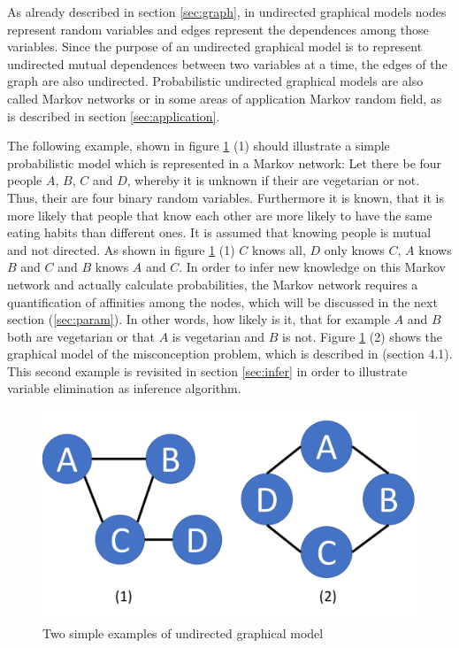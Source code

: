 \cite{hammersley1971markov}
\cite{pearl2014probabilistic}

As already described in section \ref{sec:graph}, in undirected graphical models nodes represent random variables and edges represent the dependences among those variables. Since the purpose of an undirected graphical model is to represent undirected mutual dependences between two variables at a time, the edges of the graph are also undirected. Probabilistic undirected graphical models are also called Markov networks or in some areas of application Markov random field, as is described in section \ref{sec:application}.

The following example, shown in figure \ref{fig:basic} (1) should illustrate a simple probabilistic model which is represented in a Markov network: Let there be four people $A$, $B$, $C$ and $D$, whereby it is unknown if their are vegetarian or not. Thus, their are four binary random variables. Furthermore it is known, that it is more likely that people that know each other are more likely to have the same eating habits than different ones. It is assumed that knowing people is mutual and not directed. As shown in figure \ref{fig:basic} (1) $C$ knows all, $D$ only knows $C$, $A$ knows $B$ and $C$ and $B$ knows $A$ and $C$. In order to infer new knowledge on this Markov network and actually calculate probabilities, the Markov network requires a quantification of affinities among the nodes, which will be discussed in the next section (\ref{sec:param}). In other words, how likely is it, that for example $A$ and $B$ both are vegetarian or that $A$ is vegetarian and $B$ is not. Figure \ref{fig:basic} (2) shows the graphical model of the misconception problem, which is described in \cite{koller2009probabilistic} (section 4.1). This second example is revisited in section \ref{sec:infer} in order to illustrate variable elimination as inference algorithm.

\begin{figure}[htpb]
  \centering
  	\includegraphics[scale=0.3]{img/basic.pdf} 
  \caption{Two simple examples of undirected graphical model}
  \label{fig:basic}
\end{figure}

